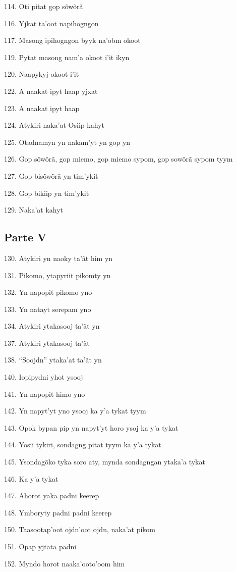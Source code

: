 114. Oti pitat gop sõwõrã

116. Yjkat ta'oot napihogngon

117. Masong ipihogngon byyk na'obm okoot

119. Pytat masong nam'a okoot i'it ikyn

120. Naapykyj okoot i'it

122. A naakat ipyt haap yjxat

123. A naakat ipyt haap

124. Atykiri naka'at Osiip kahyt

125. Otadnamyn yn nakam'yt yn gop yn

126. Gop sõwõrã, gop miemo, gop miemo sypom, gop sowõrã sypom tyym

127. Gop bisõwõrã yn tim'ykit

128. Gop bikiip yn tim'ykit

129. Naka'at kahyt

\subsection{Parte V}

130. Atykiri yn naoky ta'ãt him yn

131. Pikomo, ytapyriit pikomty yn

132. Yn napopit pikomo yno

133. Yn natayt serepam yno

134. Atykiri ytakasooj ta'ãt yn

137. Atykiri ytakasooj ta'ãt

138. ``Soojdn'' ytaka'at ta'ãt yn

140. Iopipydni yhot ysooj

141. Yn napopit himo yno

142. Yn napyt'yt yno ysooj ka y'a tykat tyym

143. Opok bypan pip yn napyt'yt horo ysoj ka y'a tykat

144. Yosii tykiri, sondagng pitat tyym ka y'a tykat

145. Ysondagõko tyka soro aty, mynda sondagngan ytaka'a tykat

146. Ka y'a tykat

147. Ahorot yaka padni keerep

148. Ymboryty padni padni keerep

150. Taasootap'oot ojdn'oot ojdn, naka'at pikom

151. Opap yjtata padni

152. Myndo horot naaka'ooto'oom him

